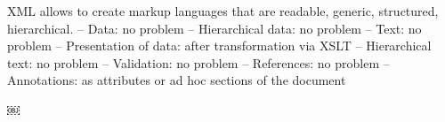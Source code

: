 
XML allows to create markup languages that are
readable, generic, structured, hierarchical.
– Data: no problem
– Hierarchical data: no problem
– Text: no problem
– Presentation of data: after transformation via XSLT
– Hierarchical text: no problem
– Validation: no problem
– References: no problem
– Annotations: as attributes or ad hoc sections of the
document 

￼
